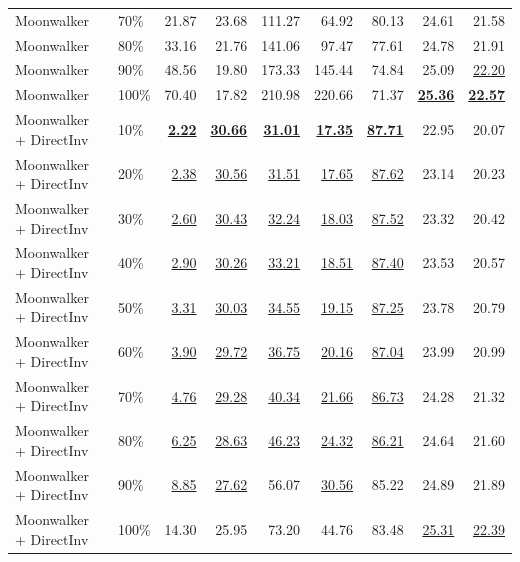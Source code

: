 \documentclass[10pt]{article}
\begin{document}
\begin{table}[htbp]
{\begin{tabular}{llrrrrrrr}
Moonwalker & 70\% & 21.87 & 23.68 & 111.27 & 64.92 & 80.13 & 24.61 & 21.58 \\
Moonwalker & 80\% & 33.16 & 21.76 & 141.06 & 97.47 & 77.61 & 24.78 & 21.91 \\
Moonwalker & 90\% & 48.56 & 19.80 & 173.33 & 145.44 & 74.84 & 25.09 & \underline{22.20} \\
Moonwalker & 100\% & 70.40 & 17.82 & 210.98 & 220.66 & 71.37 & \underline{\textbf{25.36}} & \underline{\textbf{22.57}} \\
\midrule
Moonwalker + DirectInv & 10\% & \underline{\textbf{2.22}} & \underline{\textbf{30.66}} & \underline{\textbf{31.01}} & \underline{\textbf{17.35}} & \underline{\textbf{87.71}} & 22.95 & 20.07 \\
Moonwalker + DirectInv & 20\% & \underline{2.38} & \underline{30.56} & \underline{31.51} & \underline{17.65} & \underline{87.62} & 23.14 & 20.23 \\
Moonwalker + DirectInv & 30\% & \underline{2.60} & \underline{30.43} & \underline{32.24} & \underline{18.03} & \underline{87.52} & 23.32 & 20.42 \\
Moonwalker + DirectInv & 40\% & \underline{2.90} & \underline{30.26} & \underline{33.21} & \underline{18.51} & \underline{87.40} & 23.53 & 20.57 \\
Moonwalker + DirectInv & 50\% & \underline{3.31} & \underline{30.03} & \underline{34.55} & \underline{19.15} & \underline{87.25} & 23.78 & 20.79 \\
Moonwalker + DirectInv & 60\% & \underline{3.90} & \underline{29.72} & \underline{36.75} & \underline{20.16} & \underline{87.04} & 23.99 & 20.99 \\
Moonwalker + DirectInv & 70\% & \underline{4.76} & \underline{29.28} & \underline{40.34} & \underline{21.66} & \underline{86.73} & 24.28 & 21.32 \\
Moonwalker + DirectInv & 80\% & \underline{6.25} & \underline{28.63} & \underline{46.23} & \underline{24.32} & \underline{86.21} & 24.64 & 21.60 \\
Moonwalker + DirectInv & 90\% & \underline{8.85} & \underline{27.62} & 56.07 & \underline{30.56} & 85.22 & 24.89 & 21.89 \\
Moonwalker + DirectInv & 100\% & 14.30 & 25.95 & 73.20 & 44.76 & 83.48 & \underline{25.31} & \underline{22.39} \\
\bottomrule
\end{tabular}}
\end{table}
\clearpage
\end{document}
